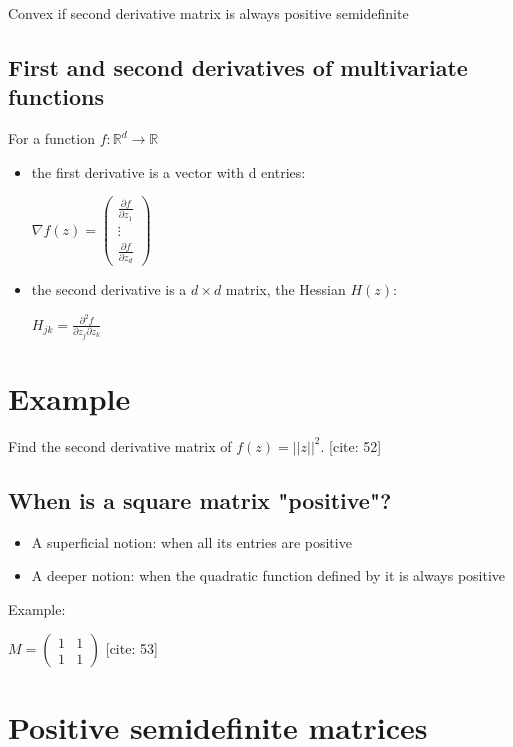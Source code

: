 \documentclass{article}
\begin{document}
Convex if second derivative matrix is always positive semidefinite

\subsection{First and second derivatives of multivariate functions}

For a function $f:\mathbb{R}^{d}\rightarrow\mathbb{R}$

\begin{itemize}
    \item the first derivative is a vector with d entries:

    $\nabla f(z)=\begin{pmatrix}\frac{\partial f}{\partial z_{1}}\\ \vdots\\ \frac{\partial f}{\partial z_{d}}\end{pmatrix}$
    \item the second derivative is a $d\times d$ matrix, the Hessian $H(z)$:

    $H_{jk}=\frac{\partial^{2}f}{\partial z_{j}\partial z_{k}}$
\end{itemize}

\section{Example}

Find the second derivative matrix of $f(z)=||z||^{2}$. [cite: 52]

\subsection{When is a square matrix "positive"?}

\begin{itemize}
    \item A superficial notion: when all its entries are positive
    \item A deeper notion: when the quadratic function defined by it is always positive
\end{itemize}

Example:

$M=\begin{pmatrix}1&1\\ 1&1\end{pmatrix}$ [cite: 53]

\section{Positive semidefinite matrices}
\end{document}
